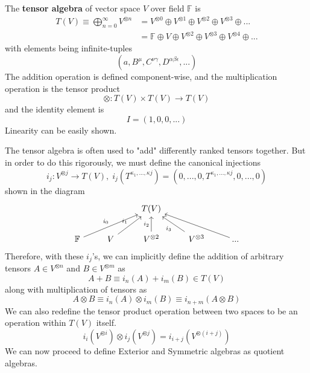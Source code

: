   \begin{definition}
    The \textbf{tensor algebra} of vector space $V$ over field $\mathbb{F}$ is 
    \begin{align*}
      T(V) \equiv \bigoplus_{n = 0}^{\infty} V^{\otimes n} & = V^{\otimes 0} \oplus V^{\otimes 1} \oplus V^{\otimes 2} \oplus V^{\otimes 3} \oplus ... \\
      & = \mathbb{F} \oplus V \oplus V^{\otimes 2} \oplus V^{\otimes 3} \oplus V^{\otimes 4} \oplus ...
    \end{align*}
    with elements being infinite-tuples
    \begin{equation}
      (a, B^\mu, C^{\nu \gamma}, D^{\alpha \beta \epsilon}, ...)
    \end{equation}
    The addition operation is defined component-wise, and the multiplication operation is the tensor product 
    \begin{equation}
      \otimes: T(V) \times T(V) \longrightarrow T(V)
    \end{equation}
    and the identity element is
    \begin{equation}
      I = (1, 0, 0, ...)
    \end{equation}
    Linearity can be easily shown. 
  \end{definition}

  The tensor algebra is often used to "add" differently ranked tensors together. But in order to do this rigorously, we must define the canonical injections
  \begin{equation}
    i_j: V^{\otimes j} \longrightarrow T(V), \; i_j (T^{\kappa_1, ..., \kappa j}) = (0, ...,0, T^{\kappa_1, ..., \kappa j}, 0, ..., 0) 
  \end{equation}
  shown in the diagram
  \[\begin{tikzcd}
      & & T(V) & & \\
      \mathbb{F} \arrow{urr}{i_0} & V \arrow{ur}{i_1} & V^{\otimes 2} \arrow{u}{i_2} & V^{\otimes 3} \arrow{ul}{i_3} & ... \arrow{ull}
  \end{tikzcd}\]
  Therefore, with these $i_j$'s, we can implicitly define the addition of arbitrary tensors $A \in V^{\otimes n}$ and $B \in V^{\otimes m}$ as 
  \begin{equation}
    A + B \equiv i_n (A) + i_m (B) \in T(V)
  \end{equation}
  along with multiplication of tensors as
  \begin{equation}
    A \otimes B \equiv i_n(A) \otimes i_m(B) \equiv i_{n+m} (A \otimes B)
  \end{equation}
  We can also redefine the tensor product operation between two spaces to be an operation within $T(V)$ itself. 
  \begin{equation}
    i_i(V^{\otimes i}) \otimes i_j( V^{\otimes j}) = i_{i+j} (V^{\otimes (i+j)})
  \end{equation}
  We can now proceed to define Exterior and Symmetric algebras as quotient algebras. 

